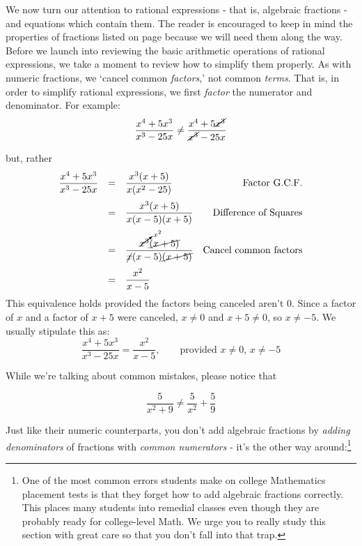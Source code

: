 

\setcounter{footnote}{0}

\label{AppRatExpEqus}

We now turn our attention to rational expressions - that is, algebraic fractions - and equations which contain them.  The reader is encouraged to keep in mind the properties of fractions listed on page \pageref{fractionarithmetic} because we will need them along the way.  Before we launch into reviewing the basic arithmetic operations of rational expressions, we take a moment to review how to simplify them properly.  As with numeric fractions, we `cancel common \textit{factors},' not common \textit{terms}.  That is, in order to simplify rational expressions, we first \textit{factor} the numerator and denominator.  For example:  \[ \dfrac{x^4 + 5x^3}{x^3 - 25x} \neq \dfrac{x^4 + 5\cancel{x^3}}{\cancel{x^3} - 25x} \]

but, rather \[ \begin{array}{rclr}

\dfrac{x^4 + 5x^3}{x^3 - 25x} & = & \dfrac{x^3(x + 5)}{x(x^2-25)} & \text{Factor G.C.F.} \\ [12pt]
                             & = & \dfrac{x^3(x + 5)}{x(x-5)(x+5)} & \text{Difference of Squares} \\ [12pt]
														& = & \dfrac{\cancelto{x^2}{x^3}\cancel{(x + 5)}}{\cancel{x}(x-5)\cancel{(x+5)}} & \text{Cancel common factors}\\ [12pt]                         
														& = & \dfrac{x^2}{x-5} & \\ \end{array}\] This equivalence holds provided the factors being canceled aren't $0$. Since a factor of $x$ and a factor of $x+5$ were canceled, $x \neq 0$ and $x+5 \neq 0$, so $x \neq -5$.   We usually stipulate this as: \[ \dfrac{x^4 + 5x^3}{x^3 - 25x}  = \dfrac{x^2}{x-5}, \qquad \text{provided $x \neq 0$, $x \neq -5$} \]

While we're talking about common mistakes, please notice that 

\[ \dfrac{5}{x^2+9} \neq \dfrac{5}{x^2} + \dfrac{5}{9} \] 

Just like their numeric counterparts, you don't add algebraic fractions by \textit{adding denominators} of fractions with \textit{common numerators} - it's the other way around:\footnote{One of the most common errors students make on college Mathematics placement tests is that they forget how to add algebraic fractions correctly.  This places many students into remedial classes even though they are probably ready for college-level Math.  We urge you to really study this section with great care so that you don't fall into that trap.} 


